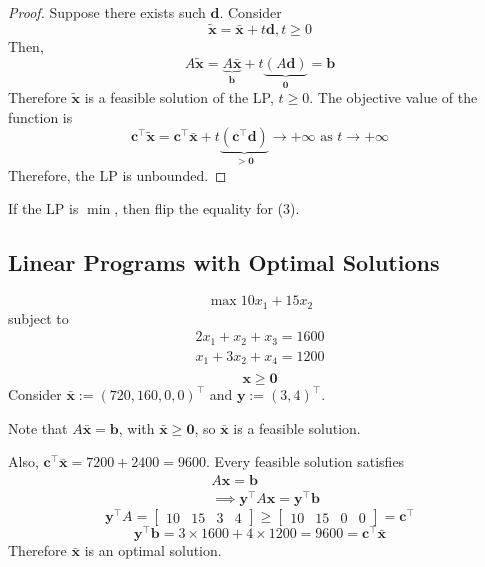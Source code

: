 \begin{proof}
    Suppose there exists such $\bm{d}$. Consider
    \[\tilde{\bm{x}}=\bar{\bm{x}}+t\bm{d}, t\geqslant  0\]
    Then,
    \[A\tilde{\bm{x}}=
        \underbrace{A\bar{\bm{x}}}_{\bm{b}}+
        t\underbrace{(A\bm{d})}_{\bm{0}}=\bm{b}\]
    Therefore $\tilde{\bm{x}}$ is a feasible solution of the LP, $t\geqslant  0$.
    The objective value of the function is
    \[\bm{c}^\top \tilde{\bm{x}}=\bm{c}^\top \bar{\bm{x}}+t
        \underbrace{(\bm{c}^\top \bm{d})}_{>\bm{0}}\rightarrow +\infty\text{ as }t\rightarrow+\infty\]
    Therefore, the LP is unbounded.
\end{proof}
\begin{remark}
    If the LP is $\min$, then flip the equality for (3).
\end{remark}

\subsection{Linear Programs with Optimal Solutions}
\begin{exbox}
    \begin{example}[Optimal LP]
        \[\max 10x_1+15x_2\]
        subject to
        \begin{align*}
            2x_1+x_2+x_3=1600 \\
            x_1+3x_2+x_4=1200 \\
        \end{align*}
        \[ \bm{x}\geqslant  \bm{0} \]
        Consider $\bar{\bm{x}}:=(720,160,0,0)^\top$ and $\bm{y}:=(3,4)^\top$.

        Note that
        $A\bar{\bm{x}}=\bm{b}$, with $\bar{\bm{x}}\geqslant  \bm{0}$,
        so $\bar{\bm{x}}$ is a feasible solution.


        Also, $\bm{c}^\top \bm{\bar{x}}=7200+2400=9600$.
        Every feasible solution satisfies
        \begin{align*}
             & A\bm{x}=\bm{b}                                  \\
             & \implies \bm{y}^\top A\bm{x}=\bm{y}^\top \bm{b}
        \end{align*}
        \[\bm{y}^\top A=
            \begin{bmatrix}
                10 & 15 & 3 & 4
            \end{bmatrix}
            \geqslant
            \begin{bmatrix}
                10 & 15 & 0 & 0
            \end{bmatrix}=\bm{c}^\top \]
        \[\bm{y}^\top \bm{b}
            =3\times 1600+4\times 1200=9600
            =\bm{c}^\top \bm{\bar{x}}\]
        Therefore $\bar{\bm{x}}$ is an optimal solution.
    \end{example}
\end{exbox}

